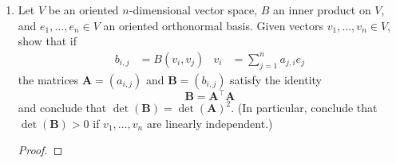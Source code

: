 \documentclass[../psets.tex]{subfiles}
\begin{document}
\begin{enumerate}[label={\textbf{4.4.\roman*.}}]
    \item Let $V$ be an oriented $n$-dimensional vector space, $B$ an inner product on $V$, and $e_1,\dots,e_n\in V$ an oriented orthonormal basis. Given vectors $v_1,\dots,v_n\in V$, show that if
    \begin{align*}
        b_{i,j} &= B(v_i,v_j)&
        v_i &= \sum_{j=1}^na_{j,i}e_j
    \end{align*}
    the matrices $\mathbf{A}=(a_{i,j})$ and $\mathbf{B}=(b_{i,j})$ satisfy the identity
    \begin{equation*}
        \mathbf{B} = \mathbf{A}^\intercal\mathbf{A}
    \end{equation*}
    and conclude that $\det(\mathbf{B})=\det(\mathbf{A})^2$. (In particular, conclude that $\det(\mathbf{B})>0$ if $v_1,\dots,v_n$ are linearly independent.)
    \begin{proof}



\end{proof}
\end{enumerate}
\end{document}
